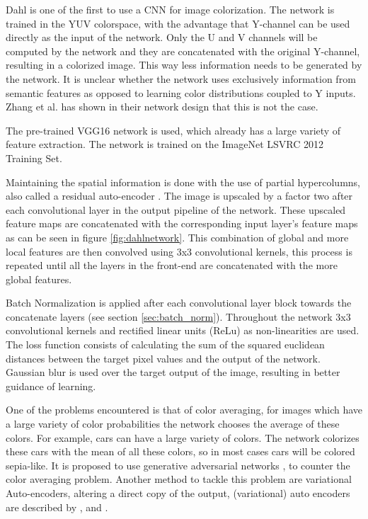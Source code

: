Dahl \cite{Dahl} is one of the first to use a CNN for image colorization. The network is trained in the YUV colorspace, with the advantage that Y-channel can be used directly as the input of the network. Only the U and V channels will be computed by the network and they are concatenated with the original Y-channel, resulting in a colorized image. This way less information needs to be generated by the network. It is unclear whether the network uses exclusively information from semantic features as opposed to learning color distributions coupled to Y inputs. Zhang et al. \cite{Zhang} has shown in their network design that this is not the case. 

The pre-trained VGG16 network is used, which already has a large variety of feature extraction. The network is trained on the ImageNet LSVRC 2012 Training Set. 

Maintaining the spatial information is done with the use of partial hypercolumns, also called a residual auto-encoder \cite{hariharan2015hypercolumns}. The image is upscaled by a factor two after each convolutional layer in the output pipeline of the network. These upscaled feature maps are concatenated with the corresponding input layer's feature maps as can be seen in figure \ref{fig:dahlnetwork}. This combination of global and more local features are then convolved using 3x3 convolutional kernels, this process is repeated until all the layers in the front-end are concatenated with the more global features. 

Batch Normalization is applied after each convolutional layer block towards the concatenate layers (see section \ref{sec:batch_norm}). 
Throughout the network 3x3 convolutional kernels and rectified linear units (ReLu) \cite{nair2010rectified} as non-linearities are used. The loss function consists of calculating the sum of the squared euclidean distances between the target pixel values and the output of the network. 
Gaussian blur is used over the target output of the image, resulting in better guidance of learning. 

One of the problems encountered is that of color averaging, for images which have a large variety of color probabilities the network chooses the average of these colors. For example, cars can have a large variety of colors. 
The network colorizes these cars with the mean of all these colors, so in most cases cars will be colored sepia-like. It is proposed to use generative adversarial networks \cite{Radford}, to counter the color averaging problem. 
Another method to tackle this problem are variational Auto-encoders, altering a direct copy of the output, (variational) auto encoders are described by \cite{Gregor}, \cite{Kingma} and \cite{GoodfellowBOOK}. 



